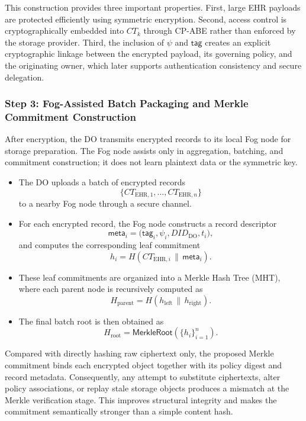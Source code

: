 \documentclass[conference]{IEEEtran}
\begin{document}
This construction provides three important properties. First, large EHR payloads are protected efficiently using symmetric encryption. Second, access control is cryptographically embedded into $CT_k$ through CP-ABE rather than enforced by the storage provider. Third, the inclusion of $\psi$ and $\mathsf{tag}$ creates an explicit cryptographic linkage between the encrypted payload, its governing policy, and the originating owner, which later supports authentication consistency and secure delegation.

\subsubsection*{Step 3: Fog-Assisted Batch Packaging and Merkle Commitment Construction}

After encryption, the DO transmits encrypted records to its local Fog node for storage preparation. The Fog node assists only in aggregation, batching, and commitment construction; it does not learn plaintext data or the symmetric key.

\begin{itemize}

\item The DO uploads a batch of encrypted records
\[
\{CT_{\text{EHR},1}, \dots, CT_{\text{EHR},n}\}
\]
to a nearby Fog node through a secure channel.

\item For each encrypted record, the Fog node constructs a record descriptor
\[
\mathsf{meta}_i = \bigl(\mathsf{tag}_i, \psi_i, DID_{\text{DO}}, t_i \bigr),
\]
and computes the corresponding leaf commitment
\[
h_i = H(CT_{\text{EHR},i} \,\|\, \mathsf{meta}_i).
\]

\item These leaf commitments are organized into a Merkle Hash Tree (MHT), where each parent node is recursively computed as
\[
H_{\text{parent}} = H(h_{\text{left}} \,\|\, h_{\text{right}}).
\]

\item The final batch root is then obtained as
\[
H_{\text{root}} = \textsf{MerkleRoot}(\{h_i\}_{i=1}^{n}).
\]

\end{itemize}

Compared with directly hashing raw ciphertext only, the proposed Merkle commitment binds each encrypted object together with its policy digest and record metadata. Consequently, any attempt to substitute ciphertexts, alter policy associations, or replay stale storage objects produces a mismatch at the Merkle verification stage. This improves structural integrity and makes the commitment semantically stronger than a simple content hash.
\end{document}
